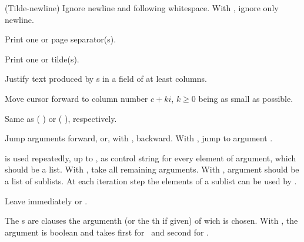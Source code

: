 \begin{LIST}{1cm}
\begin{LIST}{.5cm}
    {
    (Tilde-newline) Ignore newline and following
    whitespace. With , ignore only newline.
  }

    {
    Print one or  page separator(s).
  }

    {
    Print one or  tilde(s).
  }

    {
    Justify text produced by s in a field of at least
     columns.
  }

    {
    Move cursor forward to column number $c + ki$, $k \geq 0$ being as small
    as possible.
  }

    {
    Same as (  ) or
    (  ), respectively.
  }

    {
    Jump  arguments forward, or, with \kwd{:}, backward. With
    , jump to argument .
  }

    {
     is used repeatedly, up to , as control
    string for every element of argument, which should be a list. With
    , take all remaining arguments. With \kwd{:}, argument should be
    a list of sublists. At each iteration step the elements of a
    sublist can be used by . 
  }

    \IT{\KWD{\TLD\^{}}}
    {
    Leave immediately \kwd{\TLD\boldmath{$<$} \TLD\boldmath{$>$}} or
    \kwd{\TLD\boldmath{$\{$} \TLD\boldmath{$\}$}}.
  }

    {
    The s are clauses the argumenth (or the th if given) of wich is chosen. With
    \kwd{:}, the argument is boolean and takes first  for \NIL\ and
    second  for \T.
  }


\end{LIST}
\end{LIST}
